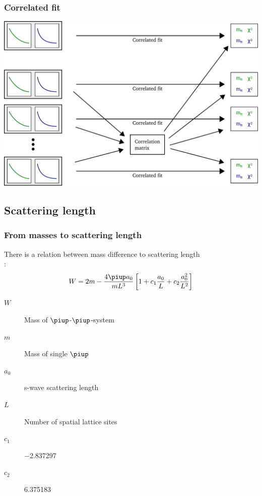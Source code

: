\documentclass[english, fleqn]{beamer}
\begin{document}
\begin{frame}
    \frametitle{Correlated fit}
    \begin{center}
        \includegraphics[scale=\scale]{sketches/06-fit.pdf}
    \end{center}
\end{frame}

\subsection{Scattering length}

\begin{frame}
    \frametitle{From masses to scattering length}

    There is a relation between mass difference to scattering length \\
    \parencite[(1.3)]{luescher/volume_dependence}:
    \[
        W = 2m - \frac{4 \piup a_0}{m L^3} \sbr{1 + c_1 \frac{a_0}L + c_2 \frac{a_0^2}{L^2}}
    \]

    \begin{description}
        \item[$W$] Mass of $\piup$-$\piup$-system
        \item[$m$] Mass of single $\piup$
        \item[$a_0$] s-wave scattering length
        \item[$L$] Number of spatial lattice sites
        \item[$c_1$] \num{-2.837297}
        \item[$c_2$] \num{6.375183}
    \end{description}
\end{frame}
\end{document}

